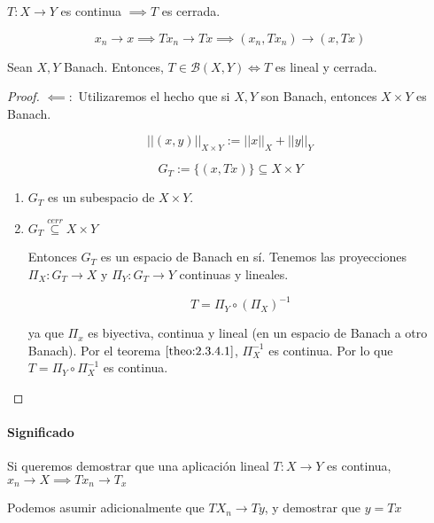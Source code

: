 \begin{fnote}
    $T:X\to Y$ es continua $\implies T$ es cerrada.

    \[x_n\to x\implies Tx_n\to Tx\implies (x_n,Tx_n)\to (x,Tx)\]
\end{fnote}

\begin{ftheorem}
    Sean $X,Y$ Banach. Entonces, $T\in \mathcal{B}(X,Y)\iff T$ es lineal y cerrada.
\end{ftheorem}

\begin{proof}
    $\impliedby:$ Utilizaremos el hecho que si $X,Y$ son Banach, entonces $X\times Y$ es Banach.

    \[||(x,y)||_{X\times Y}:=||x||_X+||y||_Y\]

    \[G_T:=\{(x,Tx)\}\subseteq X\times Y\]

    \begin{enumerate}
        \item $G_T$ es un subespacio de $X\times Y$.
        \item $G_T\overset{cerr}{\subseteq}X\times Y$

        Entonces $G_T$ es un espacio de Banach en sí. Tenemos las proyecciones $\Pi_X:G_T\to X$ y $\Pi_Y:G_T\to Y$ continuas y lineales.

        \[T=\Pi_Y\circ (\Pi_X)^{-1}\]

        ya que $\Pi_x$ es biyectiva, continua y lineal (en un espacio de Banach a otro Banach). Por el teorema $\ref{theo:2.3.4.1}$, $\Pi_X^{-1}$ es continua. Por lo que $T=\Pi_Y\circ \Pi_X^{-1}$ es continua.
    \end{enumerate}
\end{proof}

\paragraph*{Significado} Si queremos demostrar que una aplicación lineal $T:X\to Y$ es continua, $x_n\to X\implies Tx_n\to T_x$

Podemos asumir adicionalmente que $TX_n\to Ty$, y demostrar que $y=Tx$